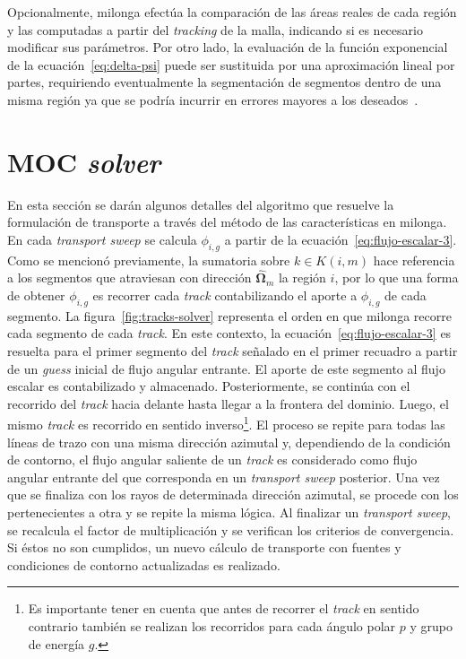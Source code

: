 \documentclass[11pt]{article}
\numberwithin{equation}{section}
\begin{document}
Opcionalmente, milonga efectúa la comparación de las áreas reales de cada región y las computadas a partir del \emph{tracking} de la malla, indicando si es necesario modificar sus parámetros. Por otro lado, la evaluación de la función exponencial de la ecuación~\eqref{eq:delta-psi} puede ser sustituida por una aproximación lineal por partes, requiriendo eventualmente la segmentación de segmentos dentro de una misma región ya que se podría incurrir en errores mayores a los deseados~\cite{openmoc2014}.


\section{MOC \emph{solver}}

En esta sección se darán algunos detalles del algoritmo que resuelve la formulación de transporte a través del método de las características en milonga. En cada \emph{transport sweep} se calcula $\phi_{i,g}$ a partir de la ecuaci\'on~\eqref{eq:flujo-escalar-3}. Como se mencion\'o previamente, la sumatoria sobre $k \in K(i,m)$ hace referencia a los segmentos que atraviesan con dirección $\boldsymbol{\hat{\Omega}}_m$ la región $i$, por lo que una forma de obtener $\phi_{i,g}$ es recorrer cada \emph{track} contabilizando el aporte a $\phi_{i,g}$ de cada segmento. La figura~\ref{fig:tracks-solver} representa el orden en que milonga recorre cada segmento de cada \emph{track}. En este contexto, la ecuaci\'on~\eqref{eq:flujo-escalar-3} es resuelta para el primer segmento del \emph{track} señalado en el primer recuadro a partir de un \emph{guess} inicial de flujo angular entrante. El aporte de este segmento al flujo escalar es contabilizado y almacenado. Posteriormente, se contin\'ua con el recorrido del \emph{track} hacia delante hasta llegar a la frontera del dominio. Luego, el mismo \emph{track} es recorrido en sentido inverso\footnote{Es importante tener en cuenta que antes de recorrer el \emph{track} en sentido contrario también se realizan los recorridos para cada \'angulo polar $p$ y grupo de energía $g$.}. El proceso se repite para todas las l\'ineas de trazo con una misma dirección azimutal y, dependiendo de la condición de contorno, el flujo angular saliente de un \emph{track} es considerado como flujo angular entrante del que corresponda en un \emph{transport sweep} posterior. Una vez que se finaliza con los rayos de determinada dirección azimutal, se procede con los pertenecientes a otra y se repite la misma l\'ogica. Al finalizar un \emph{transport sweep}, se recalcula el factor de multiplicación y se verifican los criterios de convergencia. Si éstos no son cumplidos, un nuevo cálculo de transporte con fuentes y condiciones de contorno actualizadas es realizado.
\end{document}
